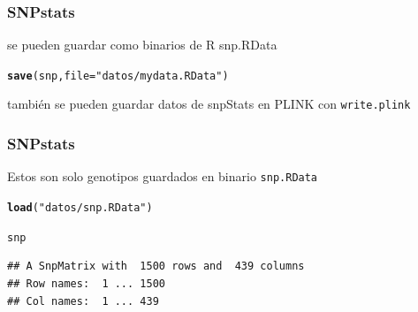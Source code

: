\documentclass{beamer}\usepackage[]{graphicx}\usepackage[]{color}
\makeatletter
\newcommand{\hlstr}[1]{\textcolor[rgb]{0.192,0.494,0.8}{#1}}%
\newcommand{\hlstd}[1]{\textcolor[rgb]{0.345,0.345,0.345}{#1}}%
\newcommand{\hlkwc}[1]{\textcolor[rgb]{0.333,0.667,0.333}{#1}}%
\newcommand{\hlkwd}[1]{\textcolor[rgb]{0.737,0.353,0.396}{\textbf{#1}}}%
\newenvironment{kframe}{%
 \def\at@end@of@kframe{}%
 \ifinner\ifhmode%
  \def\at@end@of@kframe{\end{minipage}}%
  \begin{minipage}{\columnwidth}%
 \fi\fi%
 \def\FrameCommand##1{\hskip\@totalleftmargin \hskip-\fboxsep
 \colorbox{shadecolor}{##1}\hskip-\fboxsep
     \hskip-\linewidth \hskip-\@totalleftmargin \hskip\columnwidth}%
 \MakeFramed {\advance\hsize-\width
   \@totalleftmargin\z@ \linewidth\hsize
   \@setminipage}}%
 {\par\unskip\endMakeFramed%
 \at@end@of@kframe}
\newenvironment{knitrout}{}{} %
\makeatother
\begin{document}
\begin{frame}[fragile]
\frametitle{SNPstats}
se pueden guardar como binarios de R snp.RData
\begin{knitrout}\footnotesize
{}\color{fgcolor}\begin{kframe}
\begin{alltt}
\hlkwd{save}\hlstd{(snp,} \hlkwc{file}\hlstd{=}\hlstr{"datos/mydata.RData"}\hlstd{)}
\end{alltt}
\end{kframe}
\end{knitrout}

tambi\'en se pueden guardar datos de snpStats en PLINK con {\tt write.plink}
\end{frame}


\begin{frame}[fragile]
\frametitle{SNPstats}

Estos son solo genotipos guardados en binario {\tt snp.RData} 
\begin{knitrout}\footnotesize
{}\color{fgcolor}\begin{kframe}
\begin{alltt}
\hlkwd{load}\hlstd{(}\hlstr{"datos/snp.RData"}\hlstd{)}
\end{alltt}
\end{kframe}
\end{knitrout}

\begin{knitrout}\footnotesize
{}\color{fgcolor}\begin{kframe}
\begin{alltt}
\hlstd{snp}
\end{alltt}
\begin{verbatim}
## A SnpMatrix with  1500 rows and  439 columns
## Row names:  1 ... 1500 
## Col names:  1 ... 439
\end{verbatim}
\end{kframe}
\end{knitrout}

\end{frame}
\end{document}
